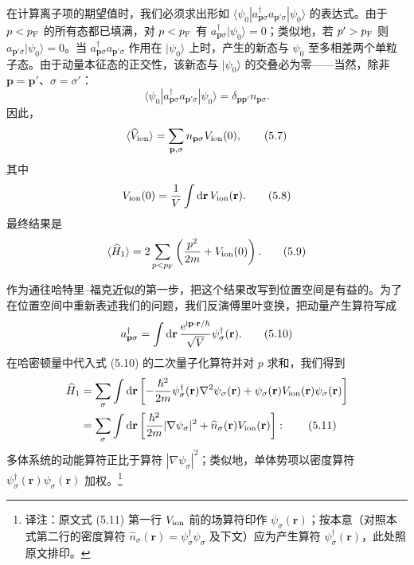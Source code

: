 在计算离子项的期望值时，我们必须求出形如 $\langle\psi_0|a_{\mathbf{p}\sigma}^\dagger a_{\mathbf{p}'\sigma}|\psi_0\rangle$ 的表达式。由于 $p<p_{\rm F}$ 的所有态都已填满，对 $p<p_{\rm F}$ 有 $a_{\mathbf{p}\sigma}^\dagger|\psi_0\rangle=0$；类似地，若 $p'>p_{\rm F}$ 则 $a_{\mathbf{p}'\sigma}|\psi_0\rangle=0$。当 $a_{\mathbf{p}\sigma}^\dagger a_{\mathbf{p}'\sigma}$ 作用在 $|\psi_0\rangle$ 上时，产生的新态与 $\psi_0$ 至多相差两个单粒子态。由于动量本征态的正交性，该新态与 $|\psi_0\rangle$ 的交叠必为零——当然，除非 $\mathbf{p}=\mathbf{p}'$、$\sigma=\sigma'$：
\begin{equation*}
\langle\psi_0|a_{\mathbf{p}\sigma}^\dagger a_{\mathbf{p}'\sigma}|\psi_0\rangle=\delta_{\mathbf{p}\mathbf{p}'}n_{\mathbf{p}\sigma}.
\tag{5.6}
\end{equation*}
因此，
\begin{equation*}
\langle\widehat{V}_{\rm ion}\rangle=\sum_{\mathbf{p},\sigma}n_{\mathbf{p}\sigma}V_{\rm ion}(0),
\tag{5.7}
\end{equation*}
其中
\begin{equation*}
V_{\rm ion}(0)=\frac{1}{V}\int{\rm d}\mathbf{r}\,V_{\rm ion}(\mathbf{r}).
\tag{5.8}
\end{equation*}
最终结果是
\begin{equation*}
\langle\widehat{H}_1\rangle=2\sum_{p<p_{\rm F}}\left(\frac{p^2}{2m}+V_{\rm ion}(0)\right).
\tag{5.9}
\end{equation*}

作为通往哈特里–福克近似的第一步，把这个结果改写到位置空间是有益的。为了在位置空间中重新表述我们的问题，我们反演傅里叶变换，把动量产生算符写成
\begin{equation*}
a_{\mathbf{p}\sigma}^\dagger=\int{\rm d}\mathbf{r}\,\frac{{\rm e}^{{\rm i}\mathbf{p}\cdot\mathbf{r}/\hbar}}{\sqrt{V}}\psi_\sigma^\dagger(\mathbf{r}).
\tag{5.10}
\end{equation*}
在哈密顿量中代入式 (5.10) 的二次量子化算符并对 $p$ 求和，我们得到
\begin{align*}
\widehat{H}_1&=\sum_\sigma\int{\rm d}\mathbf{r}\left[-\frac{\hbar^2}{2m}\psi_\sigma^\dagger(\mathbf{r})\nabla^2\psi_\sigma(\mathbf{r})+\psi_\sigma(\mathbf{r})V_{\rm ion}(\mathbf{r})\psi_\sigma(\mathbf{r})\right]\\
&=\sum_\sigma\int{\rm d}\mathbf{r}\left[\frac{\hbar^2}{2m}|\nabla\psi_\sigma|^2+\widehat{n}_\sigma(\mathbf{r})V_{\rm ion}(\mathbf{r})\right]:
\tag{5.11}
\end{align*}
多体系统的动能算符正比于算符 $|\nabla\psi_\sigma|^2$；类似地，单体势项以密度算符 $\psi_\sigma^\dagger(\mathbf{r})\psi_\sigma(\mathbf{r})$ 加权。\footnote{译注：原文式 (5.11) 第一行 $V_{\rm ion}$ 前的场算符印作 $\psi_\sigma(\mathbf{r})$；按本意（对照本式第二行的密度算符 $\widehat{n}_\sigma(\mathbf{r})=\psi_\sigma^\dagger\psi_\sigma$ 及下文）应为产生算符 $\psi_\sigma^\dagger(\mathbf{r})$，此处照原文排印。}

